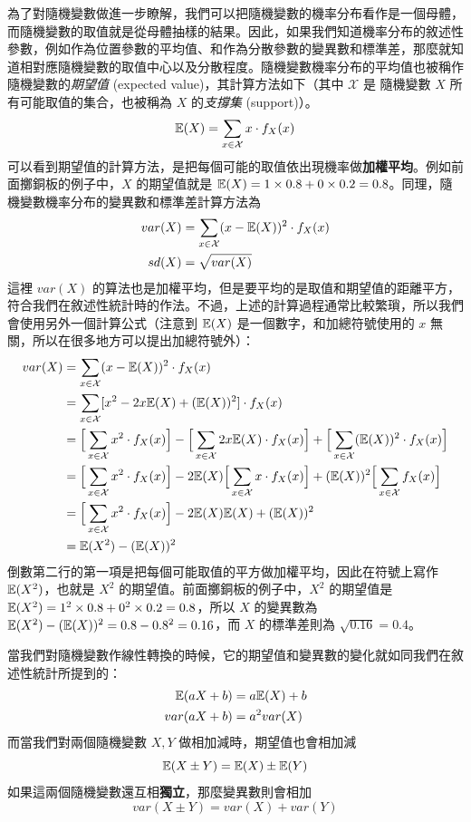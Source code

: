     為了對隨機變數做進一步瞭解，我們可以把隨機變數的機率分布看作是一個母體，而隨機變數的取值就是從母體抽樣的結果。因此，如果我們知道機率分布的敘述性參數，例如作為位置參數的平均值、和作為分散參數的變異數和標準差，那麼就知道相對應隨機變數的取值中心以及分散程度。隨機變數機率分布的平均值也被稱作隨機變數的\textit{期望值} (expected value)，其計算方法如下（其中 $\mathcal{X}$ 是 隨機變數 $X$ 所有可能取值的集合，也被稱為 $X$ 的\textit{支撐集} (support)）。
    \[\mathbb{E}(X) = \sum_{x\in\mathcal{X}} x \cdot f_X(x)\]
    可以看到期望值的計算方法，是把每個可能的取值依出現機率做\textbf{加權平均}。例如前面擲銅板的例子中，$X$ 的期望值就是 $\mathbb{E}(X) = 1 \times 0.8 + 0 \times 0.2 = 0.8$。同理，隨機變數機率分布的變異數和標準差計算方法為
    \begin{align*}
        var(X) &= \sum_{x\in\mathcal{X}} (x-\mathbb{E}(X))^2 \cdot f_X(x)\\
        sd(X) &= \sqrt{var(X)}
    \end{align*}
    這裡 $var(X)$ 的算法也是加權平均，但是要平均的是取值和期望值的距離平方，符合我們在敘述性統計時的作法。不過，上述的計算過程通常比較繁瑣，所以我們會使用另外一個計算公式（注意到 $\mathbb{E}(X)$ 是一個數字，和加總符號使用的 $x$ 無關，所以在很多地方可以提出加總符號外）：
    \begin{align*}
        var(X) &= \sum_{x\in\mathcal{X}} (x-\mathbb{E}(X))^2 \cdot f_X(x)\\
        &= \sum_{x\in\mathcal{X}} [x^2 - 2x\mathbb{E}(X) + (\mathbb{E}(X))^2] \cdot f_X(x)\\
        &= \Big[\sum_{x\in\mathcal{X}} x^2 \cdot f_X(x)\Big] - \Big[\sum_{x\in\mathcal{X}} 2x\mathbb{E}(X) \cdot f_X(x)\Big] + \Big[\sum_{x\in\mathcal{X}} (\mathbb{E}(X))^2 \cdot f_X(x)\Big]\\
        &= \Big[\sum_{x\in\mathcal{X}} x^2 \cdot f_X(x)\Big] - 2\mathbb{E}(X)\Big[\sum_{x\in\mathcal{X}} x \cdot f_X(x)\Big] + (\mathbb{E}(X))^2\Big[\sum_{x\in\mathcal{X}} f_X(x)\Big]\\
        &= \Big[\sum_{x\in\mathcal{X}} x^2 \cdot f_X(x)\Big] - 2\mathbb{E}(X)\mathbb{E}(X) + (\mathbb{E}(X))^2\\
        &= \mathbb{E}(X^2) - (\mathbb{E}(X))^2
    \end{align*}
    倒數第二行的第一項是把每個可能取值的平方做加權平均，因此在符號上寫作 $\mathbb{E}(X^2)$，也就是 $X^2$ 的期望值。前面擲銅板的例子中，$X^2$ 的期望值是 $\mathbb{E}(X^2)=1^2 \times 0.8 + 0^2 \times 0.2 = 0.8$，所以 $X$ 的變異數為 $\mathbb{E}(X^2) - (\mathbb{E}(X))^2 = 0.8-0.8^2 = 0.16$，而 $X$ 的標準差則為 $\sqrt{0.16} = 0.4$。

    當我們對隨機變數作線性轉換的時候，它的期望值和變異數的變化就如同我們在敘述性統計所提到的：
    \begin{align*}
        \mathbb{E}(aX+b) &= a\mathbb{E}(X) + b\\
        var(aX+b) &= a^2 var(X)
    \end{align*}
    而當我們對兩個隨機變數 $X, Y$ 做相加減時，期望值也會相加減
    \[\mathbb{E}(X \pm Y) = \mathbb{E}(X) \pm \mathbb{E}(Y)\]
    如果這兩個隨機變數還互相\textbf{獨立}，那麼變異數則會相加
    \[var(X \pm Y) = var(X) + var(Y)\]
    
